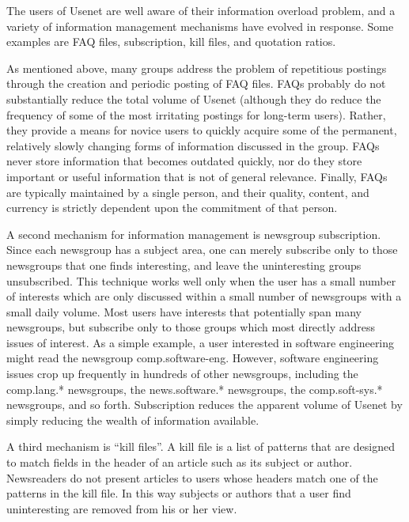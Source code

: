 The users of Usenet are well aware of their information overload problem,
and a variety of information management mechanisms have evolved in
response. Some examples are FAQ files, subscription, kill files, and
quotation ratios.

As mentioned above, many groups address the problem of repetitious postings
through the creation and periodic posting of FAQ files.  FAQs probably do
not substantially reduce the total volume of Usenet (although they do
reduce the frequency of some of the most irritating postings for long-term
users). Rather, they provide a means for novice users to quickly acquire
some of the permanent, relatively slowly changing forms of information
discussed in the group.  FAQs never store information that becomes outdated
quickly, nor do they store important or useful information that is not of
general relevance.  Finally, FAQs are typically maintained by a single
person, and their quality, content, and currency is strictly dependent upon
the commitment of that person.

A second mechanism for information management is newsgroup subscription. Since
each newsgroup has a subject area, one can merely subscribe only to those
newsgroups that one finds interesting, and leave the uninteresting groups
unsubscribed. This technique works well only when the user has a small number
of interests which are only discussed within a small number of newsgroups with
a small daily volume.  Most users have interests that potentially span many
newsgroups, but subscribe only to those groups which most directly address
issues of interest.  As a simple example, a user interested in software
engineering might read the newsgroup comp.software-eng.  However, software
engineering issues crop up frequently in hundreds of other newsgroups,
including the comp.lang.* newsgroups, the news.software.* newsgroups, the
comp.soft-sys.* newsgroups, and so forth.  Subscription reduces the apparent
volume of Usenet by simply reducing the wealth of information available.

A third mechanism is ``kill files''. A kill file is a list of patterns that
are designed to match fields in the header of an article such as its
subject or author. Newsreaders do not present articles to users
whose headers match one of the patterns in the kill file.  In this way
subjects or authors that a user find uninteresting are removed from his or
her view. 

